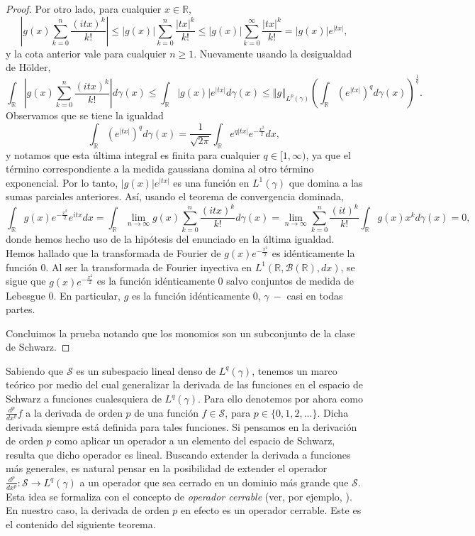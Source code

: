 \documentclass[letterpaper,twoside,12pt]{book}
\newcommand{\R}{\mathbb{R}}
\newcommand{\B}{\mathcal{B}}
\renewcommand{\S}{\mathcal{S}}
\newcommand{\1}{\mathds{1}}
\newcommand{\abs}[1]{\left\lvert #1 \right\rvert}
\renewcommand{\to}{\rightarrow}
\newcommand{\norm}[1]{\left\Vert #1 \right\Vert}
\theoremstyle{definition}
\theoremstyle{definition}
\theoremstyle{remark}
\theoremstyle{definition}
\theoremstyle{definition}
\theoremstyle{definition}
\theoremstyle{definition}
\theoremstyle{definition}
\begin{document}
\begin{proof}
   Por otro lado, para cualquier $x\in \R$,  
   \[
   \abs{g(x)\sum_{k=0}^{n}\frac{(itx)^k}{k!}}\leq |g(x)|\sum_{k=0}^{n}\frac{|tx|^{k}}{k!}\leq |g(x)|\sum_{k=0}^{\infty}\frac{|tx|^{k}}{k!}=|g(x)|e^{|tx|},
   \]
   y la cota anterior vale para cualquier $n\geq1$. Nuevamente usando la desigualdad de Hölder,
   \[
   \int_\R\abs{g(x)\sum_{k=0}^{n}\frac{(itx)^{k}}{k!}}d\gamma(x)\leq \int_\R |g(x)|e^{|tx|}d\gamma(x)\leq \norm{g}_{L^{p}(\gamma)}\left(\int_\R (e^{|tx|})^qd\gamma(x)\right)^{\frac{1}{q}}. 
   \]
   Observamos que se tiene la igualdad 
   \[
   \int_\R (e^{|tx|})^{q}d\gamma(x)=\frac{1}{\sqrt{2\pi}}\int_\R e^{q|tx|}e^{-\frac{x^2}{2}}dx,
   \]
   y notamos que esta última integral es finita para cualquier $q\in [1,\infty)$, ya que el término correspondiente a la medida gaussiana domina al otro término exponencial. Por lo tanto, $|g(x)|e^{|tx|}$ es una función en $L^{1}(\gamma)$ que domina a las sumas parciales anteriores. Así, usando el teorema de convergencia dominada, 
   \[
   \int_\R g(x)e^{-\frac{x^2}{2}}e^{itx}dx=\int_\R \lim_{n\to \infty} g(x)\sum_{k=0}^{n}\frac{(itx)^k}{k!}d\gamma(x)=\lim_{n\to \infty}\sum_{k=0}^{n}\frac{(it)^k}{k!}\int_\R g(x)x^k d\gamma(x)=0, 
   \]
   donde hemos hecho uso de la hipótesis del enunciado en la última igualdad. Hemos hallado que la transformada de Fourier de $g(x)e^{-\frac{x^2}{2}}$ es idénticamente la función 0. Al ser la transformada de Fourier inyectiva en $L^{1}(\R,\B(\R),dx)$, se sigue que $g(x)e^{-\frac{x^2}{2}}$ es la función idénticamente 0 salvo conjuntos de medida de Lebesgue 0. En particular, $g$ es la función idénticamente 0, $\gamma \ -$ casi en todas partes.  

   Concluimos la prueba notando que los monomios son un subconjunto de la clase de Schwarz.
 \end{proof}
Sabiendo que $\mathcal{S}$ es un subespacio lineal denso de $L^{q}(\gamma)$, tenemos un marco teórico por medio del cual generalizar la derivada de las funciones en el espacio de Schwarz a funciones cualesquiera de $L^{q}(\gamma)$. Para ello denotemos por ahora como $\frac{d^p}{dx^p}f$ a la derivada de orden $p$ de una función $f\in \S$, para $p\in \{0,1,2,...\}$. Dicha derivada siempre está definida para tales funciones. Si pensamos en la derivación de orden $p$ como aplicar un operador a un elemento del espacio de Schwarz, resulta que dicho operador es lineal. Buscando extender la derivada a funciones más generales, es natural pensar en la posibilidad de extender el operador $\frac{d^p}{dx^{p}}:\S\to L^{q}(\gamma)$ a un operador que sea cerrado en un dominio más grande que $\S$. Esta idea se formaliza con el concepto de \textit{operador cerrable} (ver, por ejemplo, \cite[pp. 62]{bühler2018functional}). En nuestro caso, la derivada de orden $p$ en efecto es un operador cerrable. Este es el contenido del siguiente teorema.
\end{document}
